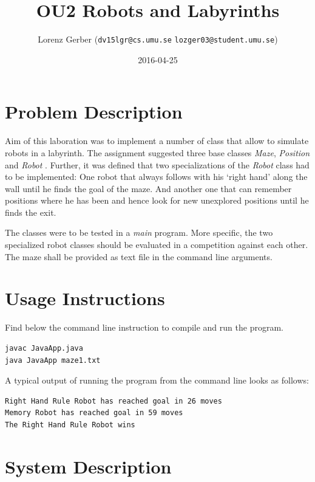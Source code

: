 \documentclass[a4paper,11pt,twoside]{article}
\title{OU2 Robots and Labyrinths}
\author{Lorenz Gerber ({\tt{dv15lgr@cs.umu.se}} {\tt{lozger03@student.umu.se}})}
\date{2016-04-25}
\begin{document}
\lstset{language=C}
\maketitle
\thispagestyle{empty}
\newpage
\tableofcontents
\thispagestyle{empty}
\newpage

\clearpage
{}

\section{Problem Description} 
Aim of this laboration was to implement a number of class that allow
to simulate robots in a labyrinth. The assignment suggested three base
classes \textit{Maze}, \textit{Position} and \textit{Robot}
\cite{maze}. Further, it was defined that two specializations of the
\textit{Robot} class had to be implemented: One robot that always
follows with his `right hand' along the wall until he finds the
goal of the maze. And another one that can remember positions where he has
been and hence look for new unexplored positions until he finds the exit.

The classes were to be tested in a \textit{main} program. More
specific, the two specialized robot classes should be evaluated in a
competition against each other. The maze shall be provided as text
file in the command line arguments. 

\section{Usage Instructions}
Find below the command line instruction to compile and run the
program. 
\begin{verbatim}
javac JavaApp.java
java JavaApp maze1.txt
\end{verbatim}

A typical output of running the program from the command line looks as
follows:
\begin{verbatim}
Right Hand Rule Robot has reached goal in 26 moves
Memory Robot has reached goal in 59 moves
The Right Hand Rule Robot wins
\end{verbatim}

\section{System Description}
\end{document}
